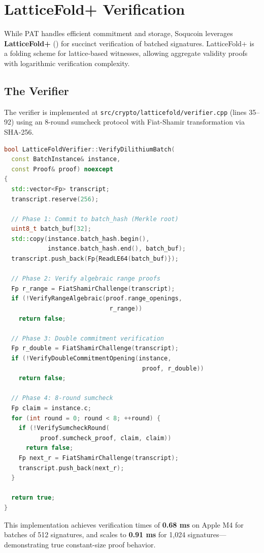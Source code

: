 \documentclass[10pt]{article}
\begin{document}
\section{LatticeFold+ Verification}

While PAT handles efficient commitment and storage, Soqucoin leverages \textbf{LatticeFold+} (\cite{latticefold2025}) for succinct verification of batched signatures. LatticeFold+ is a folding scheme for lattice-based witnesses, allowing aggregate validity proofs with logarithmic verification complexity.

\subsection{The Verifier}
The verifier is implemented at \texttt{src/crypto/latticefold/verifier.cpp} (lines 35--92) using an 8-round sumcheck protocol with Fiat-Shamir transformation via SHA-256.

\begin{lstlisting}[language=C++, caption=LatticeFold+ Batch Verification, label={lst:verifier}, firstnumber=35]
bool LatticeFoldVerifier::VerifyDilithiumBatch(
  const BatchInstance& instance, 
  const Proof& proof) noexcept
{
  std::vector<Fp> transcript;
  transcript.reserve(256);
  
  // Phase 1: Commit to batch_hash (Merkle root)
  uint8_t batch_buf[32];
  std::copy(instance.batch_hash.begin(), 
            instance.batch_hash.end(), batch_buf);
  transcript.push_back(Fp{ReadLE64(batch_buf)});
  
  // Phase 2: Verify algebraic range proofs
  Fp r_range = FiatShamirChallenge(transcript);
  if (!VerifyRangeAlgebraic(proof.range_openings, 
                             r_range)) 
    return false;
  
  // Phase 3: Double commitment verification
  Fp r_double = FiatShamirChallenge(transcript);
  if (!VerifyDoubleCommitmentOpening(instance, 
                                      proof, r_double)) 
    return false;
  
  // Phase 4: 8-round sumcheck
  Fp claim = instance.c;
  for (int round = 0; round < 8; ++round) {
    if (!VerifySumcheckRound(
          proof.sumcheck_proof, claim, claim))
      return false;
    Fp next_r = FiatShamirChallenge(transcript);
    transcript.push_back(next_r);
  }
  
  return true;
}
\end{lstlisting}

This implementation achieves verification times of \textbf{0.68 ms} on Apple M4 for batches of 512 signatures, and scales to \textbf{0.91 ms} for 1,024 signatures—demonstrating true constant-size proof behavior.
\end{document}
